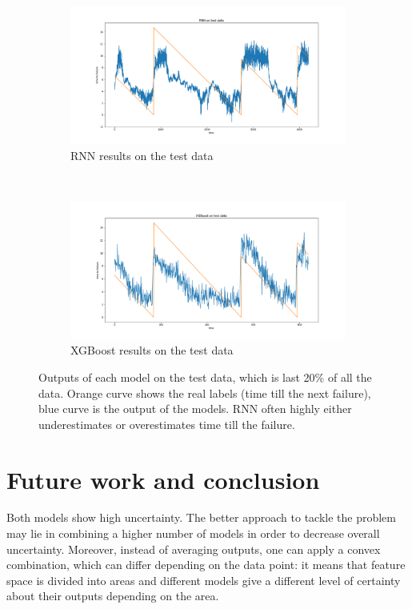 \documentclass[12pt, a4paper]{article}
\begin{document}
\begin{figure}[t!]
    \centering
    \begin{subfigure}[t]{0.5\textwidth}
        \centering
        \includegraphics[width=\linewidth]{RNN_on_test_data.png}
        \caption{RNN results on the test data}
        \label{pic1}
    \end{subfigure}%
    ~ 
    \begin{subfigure}[t]{0.5\textwidth}
        \centering
        \includegraphics[width=\linewidth]{xgboost_on_test_data.png}
        \caption{XGBoost results on the test data}
        \label{pic2}
    \end{subfigure}
    \caption{Outputs of each model on the test data, which is last 20\% of all the data. Orange curve shows the real labels (time till the next failure), blue curve is the output of the models. RNN often highly either underestimates or overestimates time till the failure.}
\end{figure}

\section{Future work and conclusion}

Both models show high uncertainty. The better approach to tackle the problem may lie in combining a higher number of models in order to decrease overall uncertainty. Moreover, instead of averaging outputs, one can apply a convex combination, which can differ depending on the data point: it means that feature space is divided into areas and different models give a different level of certainty about their outputs depending on the area. 



\end{document}
